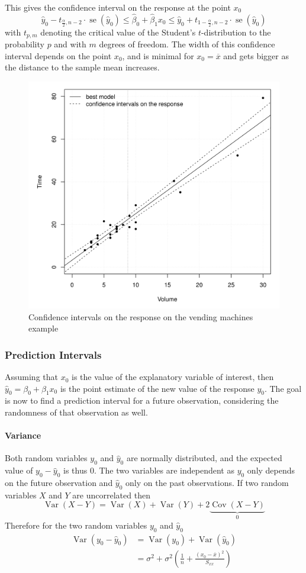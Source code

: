 \documentclass[11pt]{article}
\theoremstyle{definition}
\newcommand*\samplemean[1]{\overline{#1}}
\newcommand*\Cov[1]{\mathop{\text{Cov}}\left(#1\right)}
\newcommand*\Var[1]{\mathop{\text{Var}}\left(#1\right)}
\newcommand*\se[1]{\mathop{\text{se}}\left(#1\right)}
\begin{document}
This gives the confidence interval on the response at the point $x_0$
\begin{equation*}
	\hat{y}_0 - t_{\frac{\alpha}{2}, n-2}\cdot\se{\hat{y}_0} \leq \hat{\beta}_0 + \hat{\beta}_1 x_0 \leq \hat{y}_0 + t_{1 - \frac{\alpha}{2}, n-2}\cdot\se{\hat{y}_0}
\end{equation*}
with $t_{p,m}$ denoting the critical value of the Student's $t$-distribution to the probability $p$ and with $m$ degrees of freedom. The width of this confidence interval depends on the point $x_0$, and is minimal for $x_0 = \samplemean{x}$ and gets bigger as the distance to the sample mean increases.

\begin{figure}[H]
	\centering
	\includegraphics[width=0.5\linewidth]{img/confidence_interval_response_vending_machines}
	\caption{Confidence intervals on the response on the vending machines example}
	\label{fig:confidenceintervalresponsevendingmachines}
\end{figure}

\subsubsection{Prediction Intervals}
Assuming that $x_0$ is the value of the explanatory variable of interest, then $\hat{y}_0 = \beta_0 + \beta_1 x_0$ is the point estimate of the new value of the response $y_0$. The goal is now to find a prediction interval for a future observation, considering the randomness of that observation as well.

\paragraph{Variance} Both random variables $y_0$ and $\hat{y}_0$ are normally distributed, and the expected value of $y_0 - \hat{y}_0$ is thus $0$. The two variables are independent as $y_0$ only depends on the future observation and $\hat{y}_0$ only on the past observations. If two random variables $X$ and $Y$ are uncorrelated then
\begin{equation*}
	\Var{X - Y} = \Var{X} + \Var{Y} + 2\underbrace{\Cov{X-Y}}_0
\end{equation*}
Therefore for the two random variables $y_0$ and $\hat{y}_0$
\begin{align*}
	\Var{y_0 - \hat{y}_0} &= \Var{y_0} + \Var{\hat{y}_0}\\
	&= \sigma^2 + \sigma^2\left(\frac{1}{n} + \frac{(x_0 - \samplemean{x})^2}{S_{xx}}\right)
\end{align*}
\end{document}
